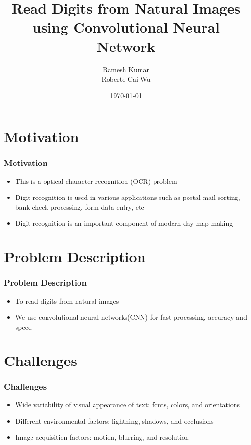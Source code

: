 \documentclass[11.5pt,aspectratio=1610,xcolor={usenames,dvipsnames,table}]{beamer}
\title{Read Digits from Natural Images using Convolutional Neural Network}
\author{Ramesh Kumar \\ Roberto Cai Wu}
\date{\today}
\begin{document}
\begin{frame}
\titlepage
\end{frame}


\section{Motivation}
\begin{frame}
	\frametitle{ Motivation}
	\begin{itemize}
		\item This is a optical character recognition (OCR) problem
		\item Digit recognition is used in various applications such as postal mail
		sorting, bank check processing, form data entry, etc
		\item Digit recognition is an important component of modern-day map making \cite{Goodfellow2013}
		
	\end{itemize}
\end{frame}

\section{Problem Description}
\begin{frame}
\frametitle{Problem Description}
\begin{itemize}
	\item To read digits from natural images 
	\item We use convolutional neural networks(CNN) for fast processing, accuracy and speed
\end{itemize}

\end{frame}


\section{Challenges}
\begin{frame}
\frametitle{Challenges}
\begin{itemize}
	\item Wide variability of visual appearance of text: fonts, colors, and orientations \cite{Goodfellow2013}
	\item Different environmental factors: lightning, shadows, and occlusions \cite{Goodfellow2013}
	\item Image acquisition factors: motion, blurring, and resolution \cite{Goodfellow2013}
\end{itemize}
\end{frame}
\end{document}
